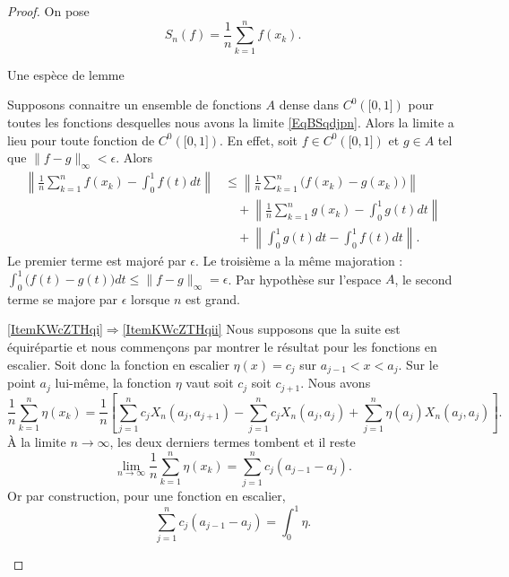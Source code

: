 \begin{proof}
	On pose
	\begin{equation}
		S_n(f)=\frac{1}{ n }\sum_{k=1}^nf(x_k).
	\end{equation}

	\begin{subproof}
		\item[Une espèce de lemme]

		Supposons connaitre un ensemble de fonctions \( A\) dense dans \( C^0(\mathopen[ 0 , 1 \mathclose])\) pour toutes les fonctions desquelles nous avons la limite \eqref{EqBSqdjpn}. Alors la limite a lieu pour toute fonction de \( C^0(\mathopen[ 0 , 1 \mathclose])\). En effet, soit \( f\in C^0(\mathopen[ 0 , 1 \mathclose])\) et \( g\in A\) tel que \( \| f-g \|_{\infty}<\epsilon\). Alors
		\begin{subequations}
			\begin{align}
				\left\|   \frac{1}{ n }\sum_{k=1}^nf(x_k)-\int_0^1f(t)dt  \right\| & \leq \left\| \frac{1}{ n }\sum_{k=1}^n\big( f(x_k)-g(x_k)\big) \right\|  \\
				                                                                   & \quad+ \left\| \frac{1}{ n }\sum_{k=1}^n  g(x_k)-\int_0^1g(t)dt \right\| \\
				                                                                   & \quad+ \left\| \int_0^1g(t)dt-\int_0^1f(t)dt \right\|.
			\end{align}
		\end{subequations}
		Le premier terme est majoré par \( \epsilon\). Le troisième a la même majoration : \( \int_0^1\big(  f(t)-g(t)\big)dt\leq \| f-g \|_{\infty}=\epsilon\). Par hypothèse sur l'espace \( A\), le second terme se majore par \( \epsilon\) lorsque \( n\) est grand.

		\item[\ref{ItemKWcZTHqi}\( \Rightarrow\)\ref{ItemKWcZTHqii}]
		Nous supposons que la suite est équirépartie et nous commençons par montrer le résultat pour les fonctions en escalier. Soit donc la fonction en escalier \( \eta(x)=c_j\) sur \( a_{j-1}< x<a_j\). Sur le point \( a_j\) lui-même, la fonction \( \eta\) vaut soit \( c_j\) soit \( c_{j+1}\). Nous avons
		\begin{equation}    \label{EqohMuel}
			\frac{1}{ n }\sum_{k=1}^n\eta(x_k)=\frac{1}{ n }\left[  \sum_{j=1}^n c_jX_n(a_j,a_{j+1})-\sum_{j=1}^n c_jX_n(a_j,a_j)+\sum_{j=1}^n \eta(a_j)X_n(a_j,a_j) \right].
		\end{equation}
		À la limite \( n\to\infty\), les deux derniers termes tombent et il reste
		\begin{equation}
			\lim_{n\to \infty} \frac{1}{ n }\sum_{k=1}^n\eta(x_k)=\sum_{j=1}^n c_j(a_{j-1}-a_j).
		\end{equation}
		Or par construction, pour une fonction en escalier,
		\begin{equation}
			\sum_{j=1}^n c_j(a_{j-1}-a_j)=\int_0^1\eta.
		\end{equation}


\end{subproof}
\end{proof}
